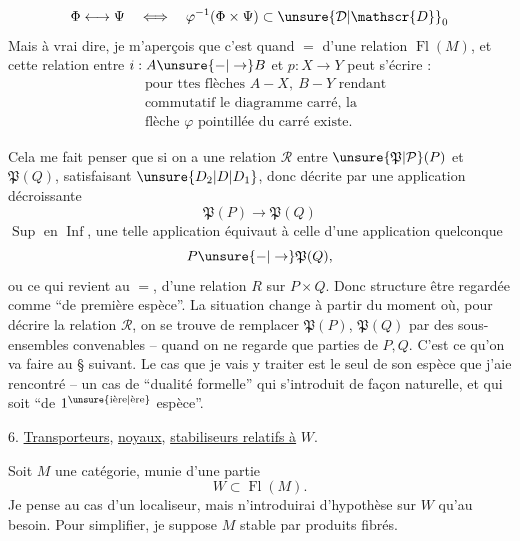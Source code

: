 \[
\Phi\longleftrightarrow\Psi\quad\Longleftrightarrow\quad
\varphi^{-1}(\Phi\times\Psi)\subset\unsure{\mathcal{D}|\mathscr{D}}_0
\]
Mais à vrai dire, je m'aperçois que c'est
quand $=$  d'une relation 
   $\operatorname{Fl}(M)$,  et cette relation
 entre $i:A\unsure{-|\to}B$ et $p:X\to Y$
peut s'écrire  :
\[
\begin{aligned}
&\text{pour ttes flèches } A-X,\ B-Y\text{ rendant}\\
&\text{commutatif le diagramme carré, la}\\
&\text{flèche }\varphi\text{ pointillée du carré existe.}
\end{aligned}\tag*{$(**)$}
\]

Cela me fait penser que si on a
une relation $\mathcal{R}$ entre $\unsure{\mathfrak{P}|\mathcal{P}}(P)$ et $\mathfrak{P}(Q)$,
satisfaisant $\unsure{D_2|D|D_1}$, donc décrite par une
application décroissante
\[
\mathfrak{P}(P)\longrightarrow\mathfrak{P}(Q)
\]
 $\operatorname{Sup}$ en $\operatorname{Inf}$,  une
telle application équivaut à celle d'une
application quelconque
\[
P\unsure{-|\to}\mathfrak{P}(Q),
\]
ou ce qui revient au $=$, d'une relation
$R$ sur $P\times Q$. Donc  structure
  être regardée comme ``de première
espèce''. La situation change à partir
du moment où, pour décrire la relation
$\mathcal{R}$, on se trouve  de remplacer
$\mathfrak{P}(P)$, $\mathfrak{P}(Q)$ par des sous-ensembles
convenables -- quand on ne regarde que
\uline{} parties de $P,Q$. C'est ce qu'on
va faire au § suivant. Le cas que je vais y
traiter est le seul de son espèce que j'aie
rencontré -- un cas de ``dualité formelle'' qui
s'introduit de façon naturelle, et qui
 soit ``de $1^{\text{\unsure{ière|ère}}}$ espèce''.

6. \uline{Transporteurs}, \uline{noyaux}, \uline{stabiliseurs relatifs à} $W$.

Soit $M$ une catégorie, munie d'une partie
\[
W\subset\operatorname{Fl}(M).\tag*{(6.1)}
\]
Je pense au cas d'un localiseur, mais n'introduirai d'hypothèse sur $W$ qu'au besoin.
Pour simplifier, je suppose $M$ stable
par produits fibrés.

